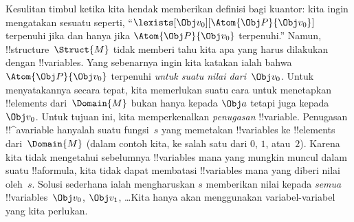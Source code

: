 \documentclass[../../../include/open-logic-section]{subfiles}
\begin{document}
Kesulitan timbul ketika kita hendak memberikan definisi bagi kuantor: kita
ingin mengatakan sesuatu seperti, ``$\lexists[\Obj v_0][\Atom{\Obj P}{\Obj
v_0}]$ terpenuhi jika dan hanya jika $\Atom{\Obj P}{\Obj v_0}$ terpenuhi.''
Namun, !!{structure}~$\Struct{M}$ tidak memberi tahu kita apa yang harus
dilakukan dengan !!{variable}s. Yang sebenarnya ingin kita katakan ialah
bahwa $\Atom{\Obj P}{\Obj v_0}$ terpenuhi \emph{untuk suatu nilai dari~$\Obj
v_0$}. Untuk menyatakannya secara tepat, kita memerlukan suatu cara untuk
menetapkan !!{element}s dari~$\Domain{M}$ bukan hanya kepada $\Obj a$ tetapi
juga kepada~$\Obj v_0$. Untuk tujuan ini, kita memperkenalkan
\emph{penugasan} !!{variable}. Penugasan !!^a{variable} hanyalah suatu
fungsi~$s$ yang memetakan !!{variable}s ke !!{element}s dari~$\Domain{M}$
(dalam contoh kita, ke salah satu dari $0$, $1$, atau~$2$). Karena kita tidak
mengetahui sebelumnya !!{variable}s mana yang mungkin muncul dalam suatu
!!a{formula}, kita tidak dapat membatasi !!{variable}s mana yang diberi nilai
oleh~$s$. Solusi sederhana ialah mengharuskan $s$ memberikan nilai kepada
\emph{semua} !!{variable}s~$\Obj v_0$, $\Obj v_1$, \dots\@ Kita hanya akan
menggunakan variabel-variabel yang kita perlukan.
\end{document}
